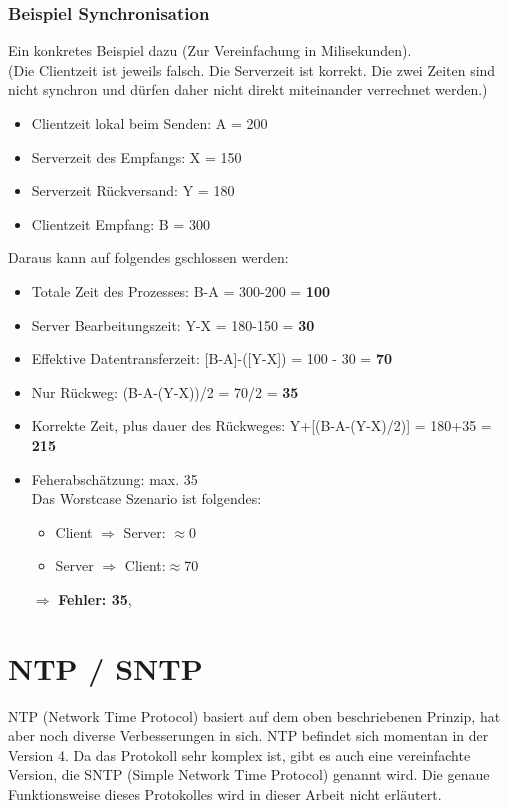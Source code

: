 \subsubsection{Beispiel Synchronisation}
Ein konkretes Beispiel dazu (Zur Vereinfachung in Milisekunden).\\
\vspace{0em}
(Die Clientzeit ist jeweils falsch. Die Serverzeit ist korrekt. Die zwei Zeiten sind nicht synchron und dürfen daher nicht direkt miteinander verrechnet werden.)
\begin{itemize}
\item Clientzeit lokal beim Senden: A = 200
\item Serverzeit des Empfangs: X = 150
\item Serverzeit Rückversand: Y = 180
\item Clientzeit Empfang: B = 300
\end{itemize}

Daraus kann auf folgendes gschlossen werden:
\begin{itemize}
\item Totale Zeit des Prozesses: B-A = 300-200 = \textbf{100}
\item Server Bearbeitungszeit: Y-X = 180-150 = \textbf{30}
\item Effektive Datentransferzeit: [B-A]-([Y-X]) = 100 - 30 = \textbf{70}
\item Nur Rückweg: (B-A-(Y-X))/2 = 70/2 = \textbf{35}
\item Korrekte Zeit, plus dauer des Rückweges: Y+[(B-A-(Y-X)/2)] = 180+35 = \textbf{215}
\item Feherabschätzung: max. 35\\
Das Worstcase Szenario ist folgendes:\\
\begin{itemize}
\item Client $\Rightarrow$ Server: $\approx$0
\item Server $\Rightarrow$ Client:$ \approx$70
\end{itemize}
$\Rightarrow$ \textbf{Fehler: 35},
\end{itemize}

\section{NTP / SNTP}
NTP (Network Time Protocol) basiert auf dem oben beschriebenen Prinzip, hat aber noch diverse Verbesserungen in sich.
NTP befindet sich momentan in der Version 4.
Da das Protokoll sehr komplex ist, gibt es auch eine vereinfachte Version, die SNTP (Simple Network Time Protocol) genannt wird.
Die genaue Funktionsweise dieses Protokolles wird in dieser Arbeit nicht erläutert.

